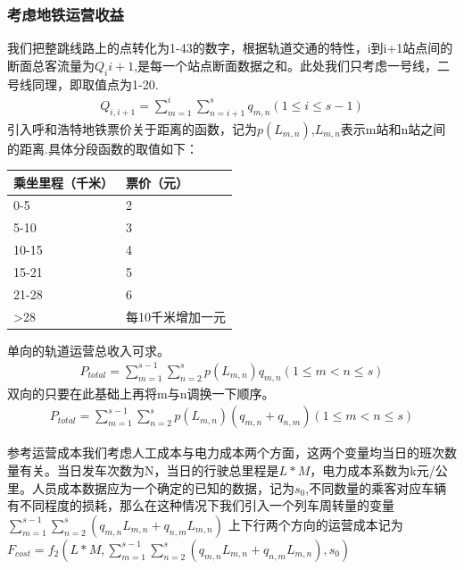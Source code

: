 \documentclass[12pt,a4paper]{mcmthesis}
\begin{document}
    \subsubsection{考虑地铁运营收益}
    我们把整跳线路上的点转化为1-43的数字，根据轨道交通的特性，i到i+1站点间的断面总客流量为$Q_{i}{i+1}$,是每一个站点断面数据之和。此处我们只考虑一号线，二号线同理，即取值点为1-20.\cite{运营收益}
    \begin{equation}
        \begin{aligned}
            Q_{i,i+1}=\sum_{m=1}^{i}\sum_{n=i+1}^{s}q_{m,n}(1\leqslant i\leqslant s-1)
        \end{aligned}
    \end{equation}
    引入呼和浩特地铁票价关于距离的函数，记为$p(L_{m,n})$,$L_{m,n}$表示m站和n站之间的距离.具体分段函数的取值如下：
    \begin{table}
        \centering
        \begin{tabular}{|l|l|}
            \hline
            乘坐里程（千米） & 票价（元）     \\ \hline
            0-5      & 2         \\ \hline
            5-10     & 3         \\ \hline
            10-15    & 4         \\ \hline
            15-21    & 5         \\ \hline
            21-28    & 6         \\ \hline
            >28      & 每10千米增加一元 \\ \hline
        \end{tabular}
    \end{table}
    单向的轨道运营总收入可求。
    \begin{equation}
        \begin{aligned}
            P_{total}=\sum_{m=1}^{s-1}\sum_{n=2}^{s}p(L_{m,n})q_{m,n} (1\leqslant m< n\leq s)
        \end{aligned}
    \end{equation}
    双向的只要在此基础上再将m与n调换一下顺序。
    \begin{equation}
        \begin{aligned}
            P_{total}=\sum_{m=1}^{s-1}\sum_{n=2}^{s}p(L_{m,n})(q_{m,n}+q_{n,m}) (1\leqslant m< n\leq s)
        \end{aligned}
    \end{equation}

    参考\cite{运营计划}运营成本我们考虑人工成本与电力成本两个方面，这两个变量均当日的班次数量有关。当日发车次数为N，当日的行驶总里程是$L*M$，电力成本系数为k元/公里。人员成本数据应为一个确定的已知的数据，记为$s_0$,不同数量的乘客对应车辆有不同程度的损耗，那么在这种情况下我们引入一个列车周转量的变量$\sum_{m=1}^{s-1}\sum_{n=2}^{s}(q_{m,n}L_{m,n}+q_{n,m}L_{m,n})$
    上下行两个方向的运营成本记为$F_{cost}=f_2(L*M,\sum_{m=1}^{s-1}\sum_{n=2}^{s}(q_{m,n}L_{m,n}+q_{n,m}L_{m,n}),s_0)$
\end{document}
